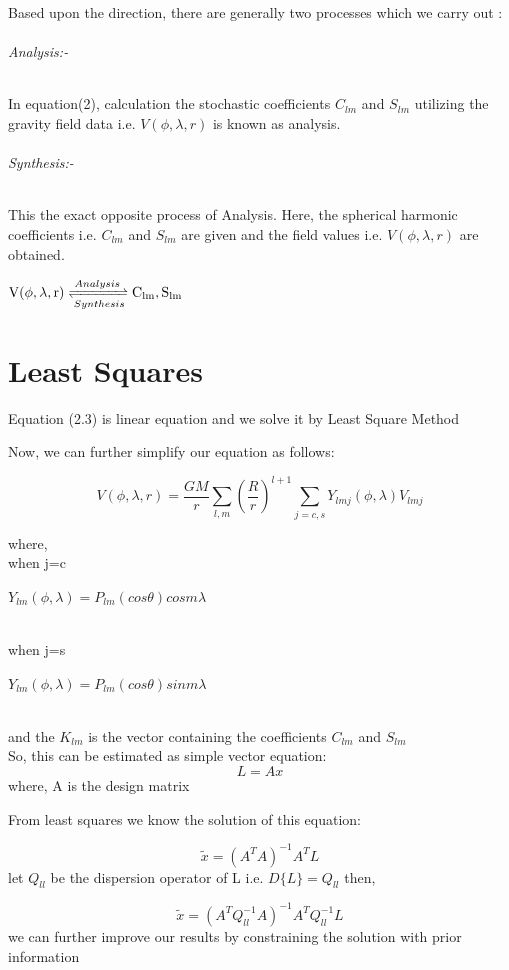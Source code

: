 \documentclass[a4paper,12pt]{report}
\begin{document}
Based upon the direction, there are generally two processes which we carry out :

\subparagraph{Analysis:- }  In equation(2), calculation the stochastic coefficients $C_{lm} $ and $S_{lm}$ utilizing the gravity field data i.e. $V(\phi,\lambda,r)$ is known as analysis.
 \subparagraph{Synthesis:- } This the exact opposite process of Analysis. Here, the spherical harmonic coefficients i.e.  $C_{lm} $ and $S_{lm}$ are given and the field values i.e. $V(\phi,\lambda,r)$ are obtained. \\

\centerline{
$\mathrm{V(\phi,\lambda,r)} \xrightleftharpoons[Synthesis]{Analysis} \mathrm{C_{lm}, S_{lm}}$
}

\newpage
\chapter{Least Squares}
Equation (2.3) is linear equation and we solve it by Least Square Method

Now, we can further simplify our equation as follows:

\begin{equation}
V(\phi,\lambda,r)=\frac{GM}{r}\sum_{l,m}^{} \left(\frac{R}{r}\right)^{l+1}\sum_{j=c,s}^{}  Y_{lmj} (\phi,\lambda) V_{lmj}
\end{equation}

where, \\
 when j=c \centerline{$Y_{lm}(\phi,\lambda)= P_{lm}(cos\theta) cosm\lambda $}\\ 
when j=s \centerline{$Y_{lm} (\phi,\lambda)= P_{lm}(cos\theta) sinm\lambda$
}
\\
and the $K_{lm}$ is the vector containing the coefficients $ C_{lm}$ and $ S_{lm}$
\\ 

So, this can be estimated as simple vector equation:
\begin{equation}
  L= Ax  
\end{equation}
where, A is the design matrix

From least squares we know the solution of this equation:

\begin{equation}
\tilde{x} =(A^T A)^{-1} A^T L
\end{equation}
let $ Q_{ll}$ be the dispersion operator of L i.e. $D\{L\}=Q_{ll}$
then,

\begin{equation}
\tilde{x} =(A^T Q_{ll}^{-1} A)^{-1} A^T Q_{ll}^{-1} L
\end{equation}
 we can further improve our results by constraining the solution with prior information
 
\end{document}
